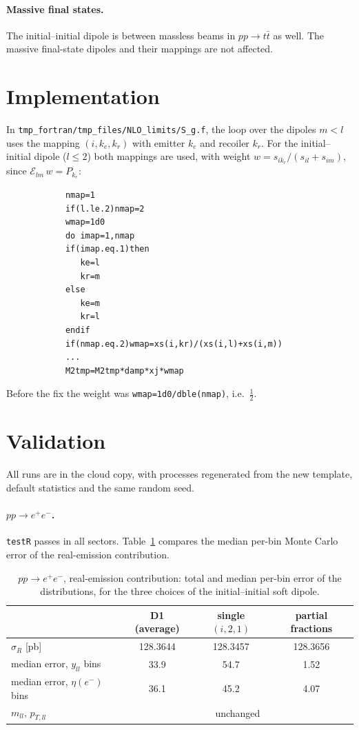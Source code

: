 \documentclass[11pt,a4paper]{article}
\newcommand{\E}{\mathcal E}
\begin{document}
\paragraph{Massive final states.}
The initial--initial dipole is between massless beams in $pp\to t\bar t$ as
well. The massive final-state dipoles and their mappings are not affected.

\section{Implementation}

In \texttt{tmp\_fortran/tmp\_files/NLO\_limits/S\_g.f}, the loop over the
dipoles $m<l$ uses the mapping $(i,k_e,k_r)$ with emitter $k_e$ and recoiler
$k_r$. For the initial--initial dipole ($l\le2$) both mappings are used, with
weight $w = s_{i k_r}/(s_{il}+s_{im})$, since
$\E_{lm}\,w = P_{k_e}$:
\begin{lstlisting}
            nmap=1
            if(l.le.2)nmap=2
            wmap=1d0
            do imap=1,nmap
            if(imap.eq.1)then
               ke=l
               kr=m
            else
               ke=m
               kr=l
            endif
            if(nmap.eq.2)wmap=xs(i,kr)/(xs(i,l)+xs(i,m))
            ...
            M2tmp=M2tmp*damp*xj*wmap
\end{lstlisting}
Before the fix the weight was \texttt{wmap=1d0/dble(nmap)}, i.e.\ $\frac12$.

\section{Validation}

All runs are in the cloud copy, with processes regenerated from the new
template, default statistics and the same random seed.

\paragraph{$pp\to e^+e^-$.}
\texttt{testR} passes in all sectors. Table~\ref{tab:ppee} compares the median
per-bin Monte Carlo error of the real-emission contribution.

\begin{table}[h]
\centering
\begin{tabular}{lccc}
\toprule
 & D1 (average) & single $(i,2,1)$ & partial fractions \\
\midrule
$\sigma_R$ [pb]                    & 128.3644 & 128.3457 & 128.3656 \\
median error, $y_{ll}$ bins        & 33.9     & 54.7     & 1.52 \\
median error, $\eta(e^-)$ bins     & 36.1     & 45.2     & 4.07 \\
$m_{ll}$, $p_{T,ll}$               & \multicolumn{3}{c}{unchanged} \\
\bottomrule
\end{tabular}
\caption{$pp\to e^+e^-$, real-emission contribution: total and median per-bin
error of the distributions, for the three choices of the initial--initial
soft dipole.}
\label{tab:ppee}
\end{table}
\end{document}
